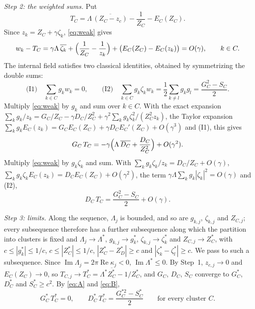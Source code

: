 \documentclass[11pt]{article}
\theoremstyle{definition}
\newcommand{\re}{\operatorname{Re}}
\newcommand{\im}{\operatorname{Im}}
\begin{document}
\emph{Step 2: the weighted sums.} Put
\[
  T_C = \Lambda\,\overline{(Z_C - z_c)} - \frac{1}{Z_C} - E_C(Z_C).
\]
Since $z_k = Z_C + \gamma\zeta_k$, \eqref{eq:weak} gives
\begin{equation}\label{eq:W}
  w_k - T_C = \gamma\Lambda\,\overline{\zeta_k} + \Bigl(\frac{1}{Z_C} - \frac{1}{z_k}\Bigr) + \bigl(E_C(Z_C) - E_C(z_k)\bigr) = O(\gamma), \qquad k \in C.
\end{equation}
The internal field satisfies two classical identities, obtained by symmetrizing the double sums:
\[
  \text{(I1)}\quad \sum_{k \in C} g_kw_k = 0, \qquad \text{(I2)}\quad \sum_{k \in C} g_k\zeta_kw_k = \frac{1}{2}\sum_{k \ne l} g_kg_l = \frac{G_C^2 - S_C}{2}.
\]
Multiply \eqref{eq:weak} by $g_k$ and sum over $k \in C$. With the exact expansion $\sum_k g_k/z_k = G_C/Z_C - \gamma D_C/Z_C^2 + \gamma^2\sum_k g_k\zeta_k^2/(Z_C^2z_k)$, the Taylor expansion $\sum_k g_kE_C(z_k) = G_CE_C(Z_C) + \gamma D_CE_C'(Z_C) + O(\gamma^3)$ and (I1), this gives
\begin{equation}\label{eq:A}
  G_C\,T_C = -\gamma\Bigl(\Lambda\,\overline{D_C} + \frac{D_C}{Z_C^2}\Bigr) + O(\gamma^2).
\end{equation}
Multiply \eqref{eq:weak} by $g_k\zeta_k$ and sum. With $\sum_k g_k\zeta_k/z_k = D_C/Z_C + O(\gamma)$, $\sum_k g_k\zeta_kE_C(z_k) = D_CE_C(Z_C) + O(\gamma^2)$, the term $\gamma\Lambda\sum_k g_k|\zeta_k|^2 = O(\gamma)$ and (I2),
\begin{equation}\label{eq:B}
  D_C\,T_C = \frac{G_C^2 - S_C}{2} + O(\gamma).
\end{equation}

\emph{Step 3: limits.} Along the sequence, $\Lambda_j$ is bounded, and so are $g_{k,j}$, $\zeta_{k,j}$ and $Z_{C,j}$; every subsequence therefore has a further subsequence along which the partition into clusters is fixed and $\Lambda_j \to \Lambda^*$, $g_{k,j} \to g_k^*$, $\zeta_{k,j} \to \zeta_k^*$ and $Z_{C,j} \to Z_C^*$, with $c \le |g_k^*| \le 1/c$, $c \le |Z_C^*| \le 1/c$, $|Z_C^* - Z_D^*| \ge c$ and $|\zeta_k^* - \zeta_l^*| \ge c$. We pass to such a subsequence. Since $\im\Lambda_j = 2\pi\re\kappa_j < 0$, $\im\Lambda^* \le 0$. By Step~1, $z_{c,j} \to 0$ and $E_C(Z_C) \to 0$, so $T_{C,j} \to T_C^* = \Lambda^*\overline{Z_C^*} - 1/Z_C^*$, and $G_C$, $D_C$, $S_C$ converge to $G_C^*$, $D_C^*$ and $S_C^* \ge c^2$. By \eqref{eq:A} and \eqref{eq:B},
\begin{equation}\label{eq:limit}
  G_C^*\,T_C^* = 0, \qquad D_C^*\,T_C^* = \frac{G_C^{*2} - S_C^*}{2} \qquad \text{for every cluster } C.
\end{equation}
\end{document}
